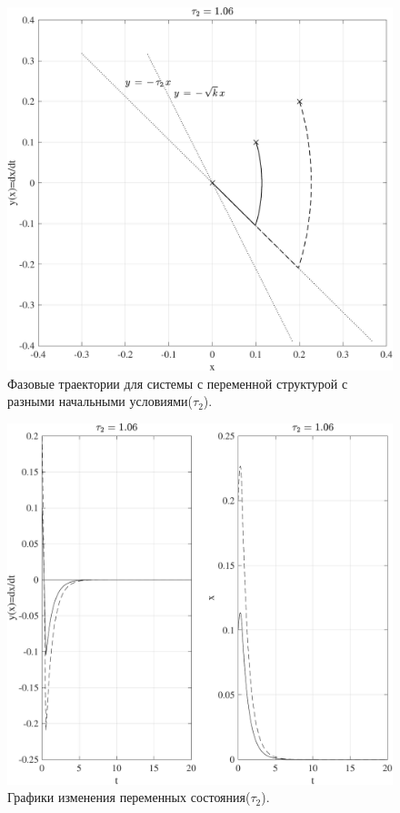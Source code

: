 \begin{figure}[!h]\centering
\includegraphics[width=0.7\linewidth]{images/variable_structure2_tau2}
\caption{ Фазовые траектории для системы с переменной структурой с разными начальными условиями($\tau_2$).}\label{fig:variable_structure2_tau2}
\end{figure}
\begin{figure}[!h]\centering
\includegraphics[width=0.7\linewidth]{images/variable_structure2_sys_tau2}
\caption{ Графики изменения переменных состояния($\tau_2$).}\label{fig:variable_structure2_sys_tau2}
\end{figure}
